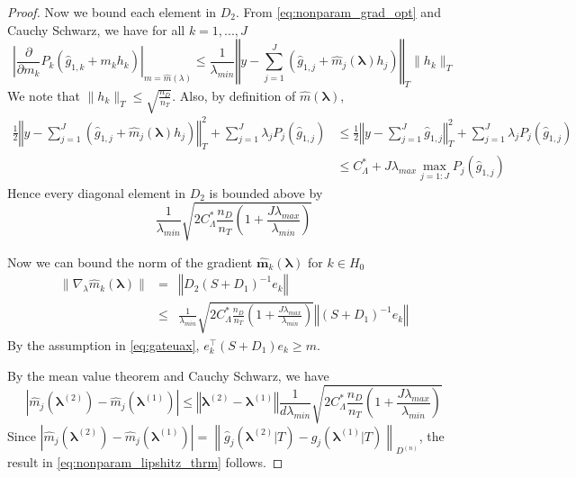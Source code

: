 \documentclass[12pt]{article}
\begin{document}
\begin{proof}
	Now we bound each element in $D_2$. From \eqref{eq:nonparam_grad_opt} and Cauchy Schwarz, we have for all $k=1,...,J$
	\begin{equation}
	\left|\frac{\partial}{\partial m_{k}}P_{k}(\hat{g}_{1,k}+m_{k}h_{k})\right|_{m=\hat{m}(\lambda)}
	\le 
	\frac{1}{\lambda_{min}}
	\left\Vert y-\sum_{j=1}^{J}\left(\hat{g}_{1,j}+\hat{m}_{j}(\boldsymbol{\lambda})h_{j}\right)
	\right\Vert _{T}\|h_{k}\|_{T}
	\end{equation}
	We note that $\|h_{k}\|_{T} \le \sqrt{\frac{n_{D}}{n_{T}}}$. Also, by definition of $\hat{m}(\boldsymbol{\lambda})$,
	\begin{align*}
	\frac{1}{2}\left\Vert y-\sum_{j=1}^{J}\left(\hat{g}_{1,j}+\hat{m}_{j}(\boldsymbol{\lambda})h_{j}\right)\right\Vert _{T}^{2}+\sum_{j=1}^{J}\lambda_{j}P_{j}(\hat{g}_{1,j})
	& \le \frac{1}{2}\left\Vert y-\sum_{j=1}^{J}\hat{g}_{1,j}\right\Vert _{T}^{2}+\sum_{j=1}^{J}\lambda_{j}P_{j}(\hat{g}_{1,j})\\
	& \le C_{\Lambda}^* + J\lambda_{max}\max_{j=1:J}P_{j}(\hat{g}_{1,j})
	\end{align*}
	Hence every diagonal element in $D_2$ is bounded above by
	\begin{equation}
	\frac{1}{\lambda_{min}}
	\sqrt{2C_{\Lambda}^* \frac{n_{D}}{n_{T}}\left(1+\frac{J\lambda_{max}}{\lambda_{min}}\right)}
	\end{equation}
	
	
	Now we can bound the norm of the gradient $\boldsymbol{\hat{m}}_k(\boldsymbol{\lambda})$ for $k \in H_0$
	\begin{eqnarray}
	\|\nabla_{\lambda}\hat{m}_{k}(\boldsymbol{\lambda})\|
	& = & \left\Vert D_{2}\left(S+D_{1}\right)^{-1}e_{k}\right\Vert \\
	& \le & \frac{1}{\lambda_{min}}
	\sqrt{2C_{\Lambda}^*
		\frac{n_{D}}{n_{T}}\left(1+\frac{J\lambda_{max}}{\lambda_{min}}\right)}\left\Vert \left(S+D_{1}\right)^{-1}e_{k}\right\Vert
	\end{eqnarray}
	By the assumption in \eqref{eq:gateuax}, $e_{k}^\top \left(S+D_{1}\right) e_{k} \ge m$.
	
	By the mean value theorem and Cauchy Schwarz, we have
	\begin{equation}
	\left|\hat{m}_{j}(\boldsymbol{\lambda}^{(2)})-\hat{m}_{j}(\boldsymbol{\lambda}^{(1)})\right| 
	\le \left\Vert \boldsymbol{\lambda}^{(2)}-\boldsymbol{\lambda}^{(1)}\right\Vert \frac{1}{d\lambda_{min}}\sqrt{2C^*_\Lambda \frac{n_{D}}{n_{T}}\left(1+\frac{J\lambda_{max}}{\lambda_{min}}\right)}
	\end{equation}
	Since $
	\left|
	\hat{m}_{j}(\boldsymbol{\lambda}^{(2)})-\hat{m}_{j}(\boldsymbol{\lambda}^{(1)})
	\right|  =
	\left \| 
	\hat{g}_{j}(\boldsymbol{\lambda}^{(2)}|T)-\hat{g}_{j}(\boldsymbol{\lambda}^{(1)}|T)
	\right  \|_{D^{(n)}}
	$, the result in \eqref{eq:nonparam_lipshitz_thrm} follows.
\end{proof}



\end{document}
